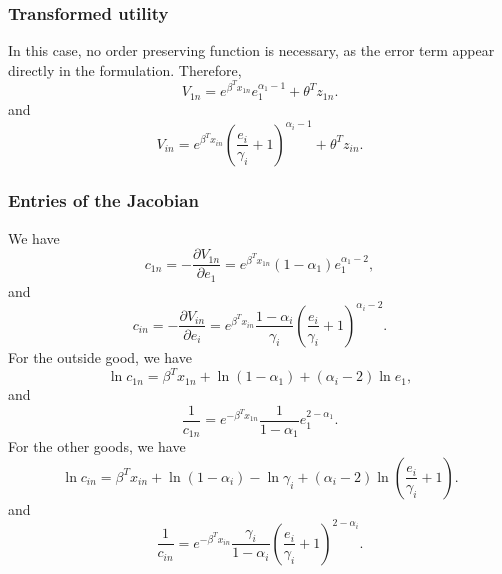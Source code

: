 \documentclass[12pt,a4paper]{article}
\begin{document}
\subsubsection*{Transformed utility}

In this case, no order preserving function is necessary, as the error term appear directly in the formulation.
Therefore,
\[
V_{1n} = e^{\beta^T x_{1n}}  e_1^{\alpha_1-1} + \theta^T z_{1n}.
\]
and
\[
V_{in} = e^{\beta^T x_{in}}  \left(\frac{e_i}{\gamma_i}+1\right)^{\alpha_i-1} + \theta^T z_{in}.
\]


\subsubsection*{Entries of the Jacobian}
We have
\[
c_{1n} = -\frac{\partial V_{1n}}{\partial e_1} =  e^{\beta^T x_{1n}} (1-\alpha_1)e_1^{\alpha_1-2},
\]
and
\[
c_{in} = -\frac{\partial V_{in}}{\partial e_i} =   e^{\beta^T x_{in}} \frac{1-\alpha_i}{\gamma_i}\left(\frac{e_i}{\gamma_i}+1\right)^{\alpha_i-2}.
\]
For the outside good, we have
\[
\ln c_{1n} =  \beta^T x_{1n} + \ln (1-\alpha_1) +(\alpha_i-2) \ln e_1,
\]
and
\[
\frac{1}{c_{1n}} =  e^{-\beta^T x_{1n}} \frac{1}{1-\alpha_1}e_1^{2-\alpha_1}.
\]
For the other goods, we have
\[
\ln c_{in} =  \beta^T x_{in} + \ln (1-\alpha_i) -\ln \gamma_i +(\alpha_i-2) \ln\left(\frac{e_i}{\gamma_i}+1\right).
\]
and
\[
\frac{1}{c_{in}} =  e^{-\beta^T x_{in}} \frac{\gamma_i}{1-\alpha_i}\left(\frac{e_i}{ \gamma_i}+1\right)^{2-\alpha_i}.
\]
\end{document}
